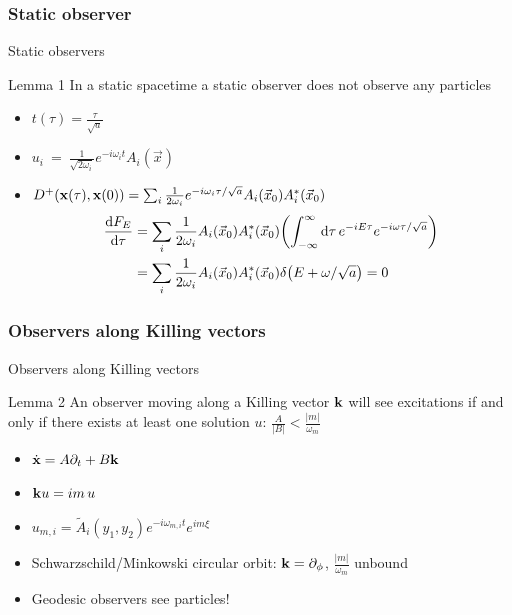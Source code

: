 \documentclass{beamer}
\renewcommand{\va}[1]{\vec{#1}}
\begin{document}
\subsubsection{Static observer}
\begin{frame}{Static observers}
\begin{block}{Lemma 1}
In a static spacetime a static observer does not observe any particles
\end{block}
\begin{itemize}
	\item \(t(\tau) = \frac{\tau}{\sqrt{a}}\)
	\item \(u_i~=~\frac{1}{\sqrt{2\omega_i}}e^{-i\omega_i t} A_i(\va{x})\)
	\item \(D^+(\vb{x}(\tau), \vb{x}(0)) = \sum_i \frac{1}{2\omega_i} e^{-i\omega_i\tau/\sqrt{a}} A_i(\va{x}_0)A_i^*(\va{x}_0)\)
	\begin{align*}
	\dv{F_E}{\tau} &= \sum_i \frac{1}{2\omega_i} A_i(\va{x}_0)A_i^*(\va{x}_0) \qty(\int_{-\infty}^\infty \dd{\tau} e^{-i E \tau} e^{-i\omega  \tau/\sqrt{a}})\\
	 	&= \sum_i \frac{1}{2\omega_i} A_i(\va{x}_0)A_i^*(\va{x}_0) \delta\qty(E + \omega/\sqrt{a}) = 0
	\end{align*}
\end{itemize}
\end{frame}

\subsubsection{Observers along Killing vectors}
\begin{frame}{Observers along Killing vectors}
\begin{block}{Lemma 2}
An observer moving along a Killing vector \(\vb{k}\) will see excitations if and only if there exists at least one solution \(u\): \(\frac{A}{|B|} < \frac{|m|}{\omega_m}\)
\begin{itemize}
	\item \(\dot{\vb{x}} = A\partial_t + B\vb{k}\)
	\item \(\vb{k} u = i m\,u\)
\end{itemize}
\end{block} 
\begin{itemize}
	\item \(u_{m, i} = \tilde{A}_i(y_1, y_2) e^{-i\omega_{m,i} t} e^{i m \xi}\)
	\item Schwarzschild/Minkowski circular orbit: \(\vb{k} = \partial_\phi\), \(\frac{|m|}{\omega_m}\) unbound
	\item Geodesic observers see particles!
\end{itemize}
\end{frame}
\end{document}
